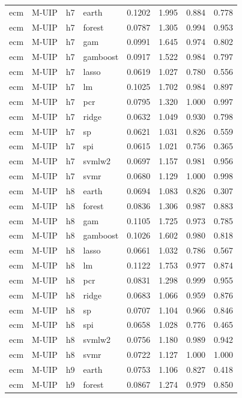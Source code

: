 \begin{ThreePartTable}
\begin{longtable}[t]{llclcccc}
\addlinespace
ecm & M-UIP & h7 & earth & 0.1202 & 1.995 & 0.884 & 0.778\\
ecm & M-UIP & h7 & forest & 0.0787 & 1.305 & 0.994 & 0.953\\
ecm & M-UIP & h7 & gam & 0.0991 & 1.645 & 0.974 & 0.802\\
ecm & M-UIP & h7 & gamboost & 0.0917 & 1.522 & 0.984 & 0.797\\
ecm & M-UIP & h7 & lasso & 0.0619 & 1.027 & 0.780 & 0.556\\
ecm & M-UIP & h7 & lm & 0.1025 & 1.702 & 0.984 & 0.897\\
ecm & M-UIP & h7 & pcr & 0.0795 & 1.320 & 1.000 & 0.997\\
ecm & M-UIP & h7 & ridge & 0.0632 & 1.049 & 0.930 & 0.798\\
ecm & M-UIP & h7 & sp & 0.0621 & 1.031 & 0.826 & 0.559\\
ecm & M-UIP & h7 & spi & 0.0615 & 1.021 & 0.756 & 0.365\\
ecm & M-UIP & h7 & svmlw2 & 0.0697 & 1.157 & 0.981 & 0.956\\
ecm & M-UIP & h7 & svmr & 0.0680 & 1.129 & 1.000 & 0.998\\
\addlinespace
ecm & M-UIP & h8 & earth & 0.0694 & 1.083 & 0.826 & 0.307\\
ecm & M-UIP & h8 & forest & 0.0836 & 1.306 & 0.987 & 0.883\\
ecm & M-UIP & h8 & gam & 0.1105 & 1.725 & 0.973 & 0.785\\
ecm & M-UIP & h8 & gamboost & 0.1026 & 1.602 & 0.980 & 0.818\\
ecm & M-UIP & h8 & lasso & 0.0661 & 1.032 & 0.786 & 0.567\\
ecm & M-UIP & h8 & lm & 0.1122 & 1.753 & 0.977 & 0.874\\
ecm & M-UIP & h8 & pcr & 0.0831 & 1.298 & 0.999 & 0.955\\
ecm & M-UIP & h8 & ridge & 0.0683 & 1.066 & 0.959 & 0.876\\
ecm & M-UIP & h8 & sp & 0.0707 & 1.104 & 0.966 & 0.846\\
ecm & M-UIP & h8 & spi & 0.0658 & 1.028 & 0.776 & 0.465\\
ecm & M-UIP & h8 & svmlw2 & 0.0756 & 1.180 & 0.989 & 0.942\\
ecm & M-UIP & h8 & svmr & 0.0722 & 1.127 & 1.000 & 1.000\\
\addlinespace
ecm & M-UIP & h9 & earth & 0.0753 & 1.106 & 0.827 & 0.418\\
ecm & M-UIP & h9 & forest & 0.0867 & 1.274 & 0.979 & 0.850\\

\end{longtable}
\end{ThreePartTable}
